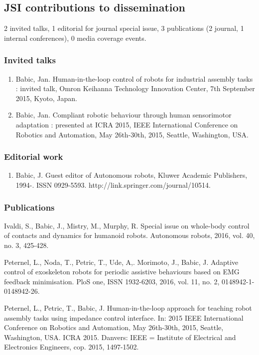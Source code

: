 \subsection{JSI contributions to dissemination}

2 invited talks, 1 editorial for journal special issue, 3 publications (2 journal, 1 internal conferences), 0 media coverage events.

\subsubsection{Invited talks}

\begin{enumerate}

\item Babic, Jan. Human-in-the-loop control of robots for industrial assembly tasks : invited talk, Omron Keihanna Technology Innovation Center, 7th September 2015, Kyoto, Japan.

\item Babic, Jan. Compliant robotic behaviour through human sensorimotor adaptation : presented at ICRA 2015, IEEE International Conference on Robotics and Automation, May 26th-30th, 2015, Seattle, Washington, USA.

\end{enumerate}

\subsubsection{Editorial work}

\begin{enumerate}
	
\item Babic, J. Guest editor of Autonomous robots, Kluwer Academic Publishers, 1994-. ISSN 0929-5593. http://link.springer.com/journal/10514.

\end{enumerate}

\subsubsection{Publications}

Ivaldi, S., Babic, J., Mistry, M., Murphy, R. Special issue on whole-body control of contacts and dynamics for humanoid robots. Autonomous robots, 2016, vol. 40, no. 3, 425-428.
 
Peternel, L., Noda, T., Petric, T., Ude, A,. Morimoto, J., Babic, J. Adaptive control of exoskeleton robots for periodic assistive behaviours based on EMG feedback minimisation. PloS one, ISSN 1932-6203, 2016, vol. 11, no. 2, 0148942-1-0148942-26.

Peternel, L., Petric, T., Babic, J. Human-in-the-loop approach for teaching robot assembly tasks using impedance control interface. In: 2015 IEEE International Conference on Robotics and Automation, May 26th-30th, 2015, Seattle, Washington, USA. ICRA 2015. Danvers: IEEE = Institute of Electrical and Electronics Engineers, cop. 2015, 1497-1502.